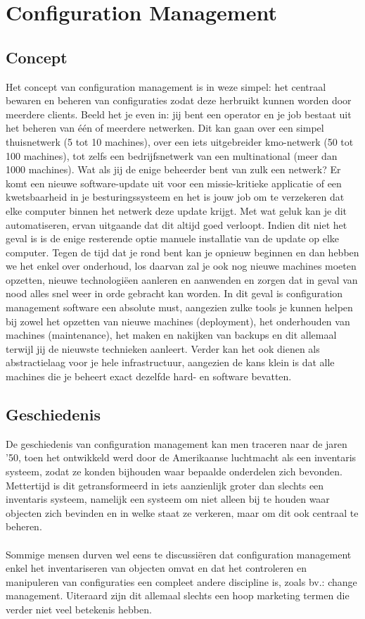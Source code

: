 \chapter{Configuration Management}
\section{Concept}
Het concept van configuration management is in weze simpel: het centraal bewaren en beheren van configuraties zodat deze herbruikt kunnen worden door meerdere clients. Beeld het je even in: jij bent een operator en je job bestaat uit het beheren van \'e\'en of meerdere netwerken. Dit kan gaan over een simpel thuisnetwerk (5 tot 10 machines), over een iets uitgebreider kmo-netwerk (50 tot 100 machines), tot zelfs een bedrijfsnetwerk van een multinational (meer dan 1000 machines). Wat als jij de enige beheerder bent van zulk een netwerk? Er komt een nieuwe software-update uit voor een missie-kritieke applicatie of een kwetsbaarheid in je besturingssysteem en het is jouw job om te verzekeren dat elke computer binnen het netwerk deze update krijgt. Met wat geluk kan je dit automatiseren, ervan uitgaande dat dit altijd goed verloopt. Indien dit niet het geval is is de enige resterende optie manuele installatie van de update op elke computer. Tegen de tijd dat je rond bent kan je opnieuw beginnen en dan hebben we het enkel over onderhoud, los daarvan zal je ook nog nieuwe machines moeten opzetten, nieuwe technologi\"een aanleren en aanwenden en zorgen dat in geval van nood alles snel weer in orde gebracht kan worden. In dit geval is configuration management software een absolute must, aangezien zulke tools je kunnen helpen bij zowel het opzetten van nieuwe machines (deployment), het onderhouden van machines (maintenance), het maken en nakijken van backups en dit allemaal terwijl jij de nieuwste technieken aanleert. Verder kan het ook dienen als abstractielaag voor je hele infrastructuur, aangezien de kans klein is dat alle machines die je beheert exact dezelfde hard- en software bevatten.

\section{Geschiedenis}
De geschiedenis van configuration management kan men traceren naar de jaren '50, toen het ontwikkeld werd door de Amerikaanse luchtmacht als een inventaris systeem, zodat ze konden bijhouden waar bepaalde onderdelen zich bevonden. Mettertijd is dit getransformeerd in iets aanzienlijk groter dan slechts een inventaris systeem, namelijk een systeem om niet alleen bij te houden waar objecten zich bevinden en in welke staat ze verkeren, maar om dit ook centraal te beheren.\\\\
Sommige mensen durven wel eens te discussi\"{e}ren dat configuration management enkel het inventariseren van objecten omvat en dat het controleren en manipuleren van configuraties een compleet andere discipline is, zoals bv.: change management. Uiteraard zijn dit allemaal slechts een hoop marketing termen die verder niet veel betekenis hebben.

